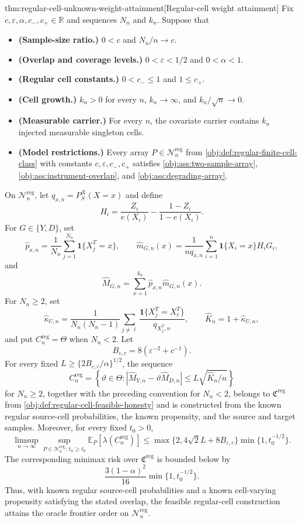 \begin{theoremv}{thm:regular-cell-unknown-weight-attainment}[Regular-cell weight attainment]
Fix \(c,\varepsilon,\alpha,c_-,c_+\in\mathbb R\) and sequences \(N_n\) and \(k_n\).  Suppose that
\begin{itemize}
\item \textbf{(Sample-size ratio.)} \(0<c\) and \(N_n/n\to c\).
\item \textbf{(Overlap and coverage levels.)} \(0<\varepsilon<1/2\) and \(0<\alpha<1\).
\item \textbf{(Regular cell constants.)} \(0<c_-\le 1\) and \(1\le c_+\).
\item \textbf{(Cell growth.)} \(k_n>0\) for every \(n\), \(k_n\to\infty\), and \(k_n/\sqrt n\to0\).
\item \textbf{(Measurable carrier.)} For every \(n\), the covariate carrier contains \(k_n\) injected measurable singleton cells.
\item \textbf{(Model restrictions.)} Every array \(P\in\mathcal N_n^{\mathrm{reg}}\) from \cref{obj:def:regular-finite-cell-class} with constants \(c,\varepsilon,c_-,c_+\) satisfies \cref{obj:ass:two-sample-array}, \cref{obj:ass:instrument-overlap}, and \cref{obj:ass:degrading-array}.
\end{itemize}
On \(\mathcal N_n^{\mathrm{reg}}\), let \(q_{x,n}=P_S^X(X=x)\) and define
\[
H_i=\frac{Z_i}{e(X_i)}-\frac{1-Z_i}{1-e(X_i)}.
\]
For \(G\in\{Y,D\}\), set
\[
\widehat p_{x,n}=\frac1{N_n}\sum_{j=1}^{N_n}\mathbf 1\{X_j^T=x\},
\qquad
\widehat m_{G,n}(x)=\frac1{nq_{x,n}}\sum_{i=1}^n
\mathbf 1\{X_i=x\}H_iG_i,
\]
and
\[
\widehat M_{G,n}=\sum_{x=1}^{k_n}\widehat p_{x,n}\widehat m_{G,n}(x).
\]
For \(N_n\ge2\), set
\[
\widehat\kappa_{U,n}
=
\frac1{N_n(N_n-1)}\sum_{j\ne\ell}
\frac{\mathbf 1\{X_j^T=X_\ell^T\}}{q_{X_j^T,n}},
\qquad
\widehat K_n=1+\widehat\kappa_{U,n},
\]
and put \(C_n^{\mathrm{reg}}=\Theta\) when \(N_n<2\).  Let
\[
B_{\varepsilon,c}=8(\varepsilon^{-2}+c^{-1}).
\]
For every fixed \(L\ge\{2B_{\varepsilon,c}/\alpha\}^{1/2}\), the sequence
\[
C_n^{\mathrm{reg}}
=
\left\{\vartheta\in\Theta:
|\widehat M_{Y,n}-\vartheta\widehat M_{D,n}|
\le L\sqrt{\widehat K_n/n}\right\}
\]
for \(N_n\ge2\), together with the preceding convention for \(N_n<2\), belongs to \(\mathfrak C^{\mathrm{reg}}\) from \cref{obj:def:regular-cell-feasible-honesty} and is constructed from the known regular source-cell probabilities, the known propensity, and the source and target samples.  Moreover, for every fixed \(t_0>0\),
\[
\limsup_{n\to\infty}\sup_{P\in\mathcal N_n^{\mathrm{reg}}:\,t_n\ge t_0}
\mathbb E_P[\lambda(C_n^{\mathrm{reg}})]
\le
\max\{2,4\sqrt2L+8B_{\varepsilon,c}\}
\min\{1,t_0^{-1/2}\}.
\]
The corresponding minimax risk over \(\mathfrak C^{\mathrm{reg}}\) is bounded below by
\[
\frac{3(1-\alpha)^2}{16}\min\{1,t_0^{-1/2}\}.
\]
Thus, with known regular source-cell probabilities and a known cell-varying propensity satisfying the stated overlap, the feasible regular-cell construction attains the oracle frontier order on \(\mathcal N_n^{\mathrm{reg}}\).
\end{theoremv}

